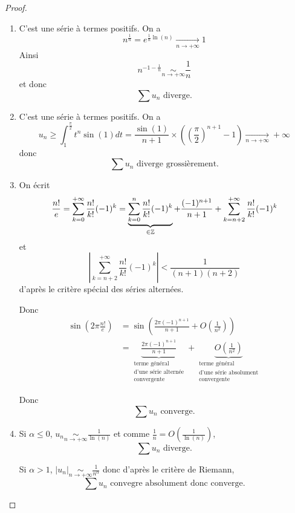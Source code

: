 \begin{proof}
	\begin{enumerate}
		\item C'est une série à termes positifs. On a 
		$$n^{\frac{1}{n}}=e^{\frac{1}{n}\ln\left(n\right)}\xrightarrow[n\to+\infty]{}1$$
		Ainsi
		$$n^{-1-\frac{1}{n}}\underset{n\to+\infty}{\sim}\frac{1}{n}$$
		et donc 
		$$\boxed{\sum u_{n}\text{ diverge.}}$$

		\item C'est une série à termes positifs. On a 
		$$u_{n}\geqslant \int_{1}^{\frac{\pi}{2}}t^{n}\sin(1)dt=\frac{\sin(1)}{n+1}\times\left(\left(\frac{\pi}{2}\right)^{n+1}-1\right)\xrightarrow[n\to+\infty]{}+\infty$$
		donc 
		$$\boxed{\sum u_{n}\text{ diverge grossièrement.}}$$

		\item On écrit 
		$$\frac{n!}{e}=\sum_{k=0}^{+\infty}\frac{n!}{k!}(-1)^{k}=\underbrace{\sum_{k=0}^{n}\frac{n!}{k!}(-1)^{k}}_{\in\mathbb{Z}}+\frac{(-1)^{n+1}}{n+1}+\sum_{k=n+2}^{+\infty}\frac{n!}{k!}(-1)^{k}$$
		et
		$$\left\vert\sum_{k=n+2}^{+\infty}\frac{n!}{k!}(-1)^{k}\right\vert<\frac{1}{(n+1)(n+2)}$$
		d'après le critère spécial des séries alternées.

		Donc 
		\begin{align*}
			\sin\left(2\pi\frac{n!}{e}\right)
			&=\sin\left(\frac{2\pi(-1)^{n+1}}{n+1}+O\left(\frac{1}{n^{2}}\right)\right)\\
			&=\underbrace{\frac{2\pi(-1)^{n+1}}{n+1}}_{\substack{\text{terme général}\\\text{d'une série alternée}\\\text{convergente}}}+\underbrace{O\left(\frac{1}{n^{2}}\right)}_{\substack{\text{terme général}\\\text{d'une série absolument}\\\text{convergente}}}
		\end{align*}
		
		Donc
		$$\boxed{\sum u_{n}\text{ converge.}}$$

		\item Si $\alpha\leqslant0$, $u_{n}\underset{n\to+\infty}{\sim}\frac{1}{\ln(n)}$ et comme $\frac{1}{n}=O\left(\frac{1}{\ln(n)}\right)$, 
		$$\boxed{\sum u_{n}\text{ diverge.}}$$

		Si $\alpha>1$, $\vert u_{n}\vert\underset{n\to+\infty}{\sim}\frac{1}{n^{\alpha}}$ donc d'après le critère de Riemann,
		$$\boxed{\sum u_{n}\text{ convegre absolument donc converge.}}$$


\end{enumerate}
\end{proof}
